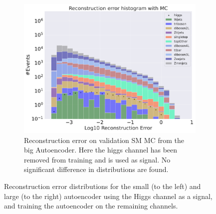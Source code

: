 \begin{figure}[h!]
\begin{subfigure}{.45\textwidth}
        \includegraphics[width=\textwidth]{Figures/AE_testing/big/b_data_recon_big_rm3_feats_sig_higgs.pdf}
        \caption{Reconstruction error on validation SM MC from the big Autoencoder. Here the higgs channel has been removed from training and 
        is used as signal. No significant difference in distributions are found. }
        \label{fig:ae_big_higgs}
    \end{subfigure}
    \hfill 
    \caption[AE | Reconstruction error using Higgs channel as signal]{Reconstruction error distributions for the small (to the left) and large (to the right) autoencoder using the Higgs channel as a signal, and 
    training the autoencoder on the remaining channels.  } 
    \label{fig:ae_big_channel_1}
    
\end{figure}


